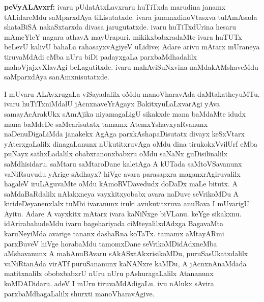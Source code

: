 {\large\textbf{peVyALAvxrf:}} ivaru pUdatAtxLavxraru huTiTxda marudina janamx tALidareMdu saMparxdAya tiLisutatxde. ivara janamxdinoVtasxva tulAmAsada shataBiSA nakaSxtarxda divasa jarugutatxde. ivaru huTiTxdUrina hesaru mAmeYleY nagara athavA mayUrapuri. mikikxbabxradaMte ivara huTUTx beLevU kalivU bahaLa rahasayxvAgiyeV uLidive; Adare arivu mAtarx mUraneya tiruvaMdAdi eMba nUru biDi padayxgaLa parxbaMdhadalilx mahoVjajxvXlavAgi beLagutitxde. ivaru mahAviSuNxvina naMdakAMshaveMdu saMparxdAya sanAmxnisutatxde.

I mUvaru ALAvxrugaLa viSayadalilx oMdu manoVharavAda daMtakatheyuMTu. ivaru huTiTxniMdalU jAcnxnaveYrAgayx BakitxyuLaLxvarAgi yAva samayAcArakUkx sAmAjika niyamagaLigU sikakxde mana baMdaMte idudx mana baMdeDe saMcarisutatx tamamx AtemxYshavxyaRvanunx naDenuDigaLiMda janakekx AgAga parxkAshapaDisutatx divayx keSxVtarx yAterxgaLalilx dina\-gaLanunx nUkutitxruvAga oMdu dina tirukokxVvilUrf eMba puNayx sathxLadalilx obabxra\-nonxbabxru oMdu saNaNx guDisilinalilx saMdhisidaru. saMtaru saMtaroDane kaletAga A kUTada saMtoVSavanunx vaNiRsuvudu yArige sAdhayx? hiVge avara parasapxra maganx\-rAgiruvalilx hagaleV iruLAguvaMte oMdu kAmoRVDavedudx doDaDx maLe bitutx. A saMdaBaRdalilx nAlakxneya vayxkitxyobabx avara naDuve seVrikoMDu A kirideDeyanenxlalx tuMbi ivaranunx iruki avukutitxruva anuBava I mUvarigU Ayitu. Adare A vayxkitx mAtarx ivara kaNiNxge biVLanu. keYge sikakxnu. idArirabahudeMdu ivaru bage\-hariyada ciMteyalilxdAdxga BagavaMta karuNeyiMda avarige tananx dashaRna koTaTx. tamamx aMta\-yARmi parxBuveV hiVge horabaMdu tamomxDane seVrikoMDidAdxneMba aMshavanunx A mahAnuBAvaru sAkASxtAkxrisikoMDu, puruSasUkatxdalilx vaNiRtanAda virATf puruSa\-nanunx kaNANxre kaMDu, A jAcnxnAnaMdada matitxnalilx obobxbabxrU nUru nUru pAshura\-gaLalilx Atananunx koMDADidaru. adeV I mUru tiruvaMdAdigaLu. ivu nAlukx sAvira parxbaMdhagaLalilx shurxti manoVharavAgive.

